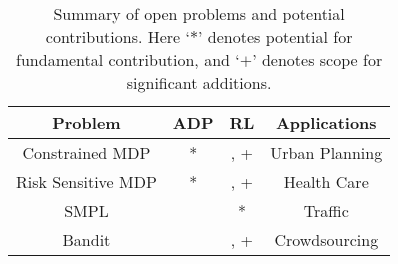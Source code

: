 \begin{table}
\centering
\begin{tabular}{|c|c|c|c|}\hline
Problem& 	ADP& 	RL& Applications \\\hline
Constrained MDP& *& \cite{const}, +& Urban Planning \\ \hline
Risk Sensitive MDP& *&  \cite{borkarQ}, +& Health Care \\ \hline
SMPL & \cite{smpl}&  *&  Traffic \\ \hline
Bandit & \cite{convex}&  \cite{auer}, + & Crowdsourcing \\ \hline
\end{tabular}
\caption{Summary of open problems and potential contributions. Here `$*$' denotes potential for fundamental contribution, and `$+$' denotes scope for significant additions.}
\label{open}
\end{table}
